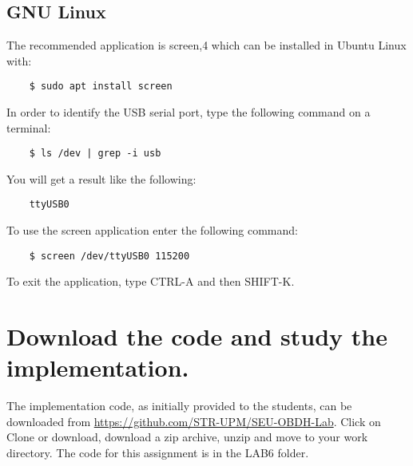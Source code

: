 \subsection{GNU Linux}

The recommended application is screen,4 which can be installed in Ubuntu Linux with:

\begin{BVerbatim}
	$ sudo apt install screen
\end{BVerbatim}

In order to identify the USB serial port, type the following command on a terminal:

\begin{BVerbatim}
	$ ls /dev | grep -i usb
\end{BVerbatim}

You will get a result like the following:

\begin{BVerbatim}
	ttyUSB0
\end{BVerbatim}

To use the screen application enter the following command:

\begin{BVerbatim}
	$ screen /dev/ttyUSB0 115200
\end{BVerbatim}

To exit the application, type CTRL-A and then SHIFT-K.

\section{Download the code and study the implementation.}

The implementation code, as initially provided to the students, can be downloaded from \url{https://github.com/STR-UPM/SEU-OBDH-Lab}. Click on Clone or download, download a zip archive, unzip and move to your work directory. The code for this assignment is in the LAB6 folder.


